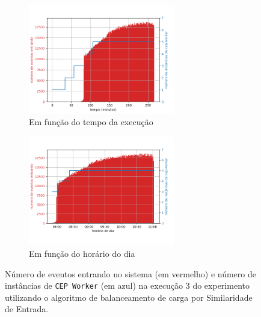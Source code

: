 \begin{figure}[h]
\centering
\begin{subfigure}{\textwidth}
\centering
\includegraphics[width=0.7\textwidth]{figuras/graphics/carga_e_workers_total8-dez-is.png}
\caption{Em função do tempo da execução}
\label{fig:workers_and_load_total-8-dez-is}
\end{subfigure}%

\begin{subfigure}{\textwidth}
\centering
\includegraphics[width=0.7\textwidth]{figuras/graphics/carga_e_workers_horario8-dez-is.png}
\caption{Em função do horário do dia}
\label{fig:workers_and_load_SPtrans-8-dez-is}
\end{subfigure}%
\caption{Número de eventos entrando no sistema (em vermelho) e número de instâncias de \texttt{CEP Worker} (em azul) na execução 3 do experimento utilizando o algoritmo de balanceamento de carga por Similaridade de Entrada.}
\end{figure}






